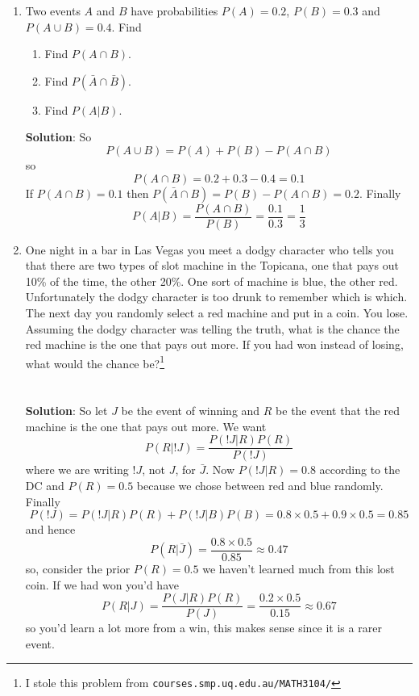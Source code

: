 \documentclass[11pt,a4paper]{scrartcl}
\begin{document}
\begin{enumerate}
\item Two events $A$ and $B$ have probabilities $P(A)=0.2$, $P(B)=0.3$ and $P(A\cup B)=0.4$. Find
\begin{enumerate}
\item Find $P(A\cap B)$.
\item Find $P(\bar{A}\cap \bar{B})$.
\item Find $P(A|B)$.
\end{enumerate}
\textbf{Solution}: So
\begin{equation}
P(A\cup B)=P(A)+P(B)-P(A\cap B)
\end{equation}
so 
\begin{equation}
P(A\cap B)=0.2+0.3-0.4=0.1
\end{equation}
If $P(A\cap B)=0.1$ then $P(\bar{A}\cap B)=P(B)-P(A\cap B)=0.2$. Finally
\begin{equation}
P(A|B)=\frac{P(A\cap B)}{P(B)}=\frac{0.1}{0.3}=\frac{1}{3}
\end{equation}



\item One night in a bar in Las Vegas you meet a dodgy character who
  tells you that there are two types of slot machine in the Topicana,
  one that pays out 10\% of the time, the other 20\%. One sort of
  machine is blue, the other red. Unfortunately the dodgy character is
  too drunk to remember which is which. The next day you randomly
  select a red machine and put in a coin. You lose. Assuming the dodgy
  character was telling the truth, what is the chance the red machine
  is the one that pays out more. If you had won instead of losing,
  what would the chance be?\footnote{I stole this problem from
    \texttt{courses.smp.uq.edu.au/MATH3104/}}\\ \\ \\ \textbf{Solution}:
  So let $J$ be the event of winning and $R$ be the event that the red
  machine is the one that pays out more. We want
\begin{equation}
P(R|!J)=\frac{P(!J|R)P(R)}{P(!J)}
\end{equation}
where we are writing $!J$, not $J$, for $\bar{J}$. Now $P(!J|R)=0.8$
according to the DC and $P(R)=0.5$ because we chose between red and
blue randomly. Finally
\begin{equation}
P(!J)=P(!J|R)P(R)+P(!J|B)P(B)=0.8\times 0.5 + 0.9\times 0.5=0.85
\end{equation}
and hence
\begin{equation}
P(R|\bar{J})=\frac{0.8\times 0.5}{0.85}\approx0.47
\end{equation}
so, consider the prior $P(R)=0.5$ we haven't learned much from this lost coin. If we had won you'd have
\begin{equation}
P(R|J)=\frac{P(J|R)P(R)}{P(J)}=\frac{0.2\times 0.5}{0.15}\approx 0.67
\end{equation}
so you'd learn a lot more from a win, this makes sense since it is a rarer event.
\end{enumerate}
\end{document}
